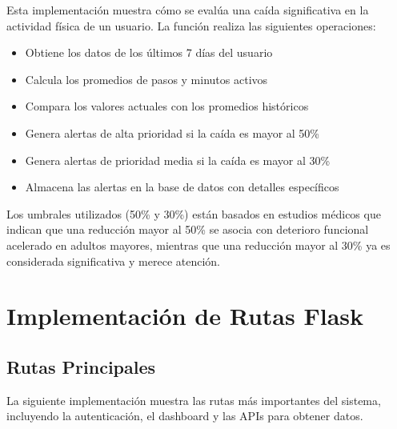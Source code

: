 Esta implementación muestra cómo se evalúa una caída significativa en la actividad física de un usuario. La función realiza las siguientes operaciones:

\begin{itemize}
    \item Obtiene los datos de los últimos 7 días del usuario
    \item Calcula los promedios de pasos y minutos activos
    \item Compara los valores actuales con los promedios históricos
    \item Genera alertas de alta prioridad si la caída es mayor al 50\%
    \item Genera alertas de prioridad media si la caída es mayor al 30\%
    \item Almacena las alertas en la base de datos con detalles específicos
\end{itemize}

Los umbrales utilizados (50\% y 30\%) están basados en estudios médicos que indican que una reducción mayor al 50\% se asocia con deterioro funcional acelerado en adultos mayores, mientras que una reducción mayor al 30\% ya es considerada significativa y merece atención.


\section{Implementación de Rutas Flask}
\label{sec:anexo_flask}

\subsection{Rutas Principales}
\label{subsec:anexo_rutas}
La siguiente implementación muestra las rutas más importantes del sistema, incluyendo la autenticación, el dashboard y las APIs para obtener datos.

